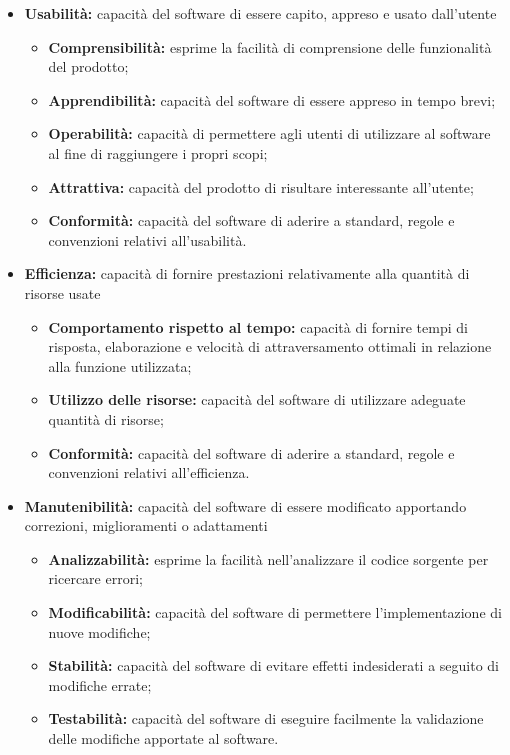 \begin{itemize}
\begin{itemize}
\begin{itemize}
						\end{itemize}
					\item \textbf{Usabilità:} capacità del software di essere capito, appreso e usato dall'utente
						\begin{itemize}
							\item \textbf{Comprensibilità:} esprime la facilità di comprensione delle funzionalità del prodotto;
							\item \textbf{Apprendibilità:} capacità del software di essere appreso in tempo brevi;
							\item \textbf{Operabilità:} capacità di permettere agli utenti di utilizzare al software al fine di raggiungere i propri scopi;
							\item \textbf{Attrattiva:} capacità del prodotto di risultare interessante all'utente;
							\item \textbf{Conformità:} capacità del software di aderire a standard, regole e convenzioni relativi all'usabilità.
						\end{itemize}
					\item \textbf{Efficienza:} capacità di fornire prestazioni relativamente alla quantità di risorse usate
						\begin{itemize}
							\item \textbf{Comportamento rispetto al tempo:} capacità di fornire tempi di risposta, elaborazione e velocità di attraversamento ottimali in relazione alla funzione utilizzata;
							\item \textbf{Utilizzo delle risorse:} capacità del software di utilizzare adeguate quantità di risorse;
							\item \textbf{Conformità:} capacità del software di aderire a standard, regole e convenzioni relativi all'efficienza.
						\end{itemize}
					\item \textbf{Manutenibilità:} capacità del software di essere modificato apportando correzioni, miglioramenti o adattamenti
						\begin{itemize}
							\item \textbf{Analizzabilità:} esprime la facilità nell'analizzare il codice sorgente per ricercare errori; 
							\item \textbf{Modificabilità:} capacità del software di permettere l'implementazione di nuove modifiche;
							\item \textbf{Stabilità:} capacità del software di evitare effetti indesiderati a seguito di modifiche errate;
							\item \textbf{Testabilità:} capacità del software di eseguire facilmente la validazione delle modifiche apportate al software.

\end{itemize}
\end{itemize}
\end{itemize}
